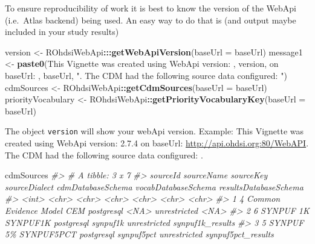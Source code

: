 \documentclass[
]{article}
\newenvironment{Shaded}{\begin{snugshade}}{\end{snugshade}}
\newcommand{\CommentTok}[1]{\textcolor[rgb]{0.56,0.35,0.01}{\textit{#1}}}
\newcommand{\DataTypeTok}[1]{\textcolor[rgb]{0.13,0.29,0.53}{#1}}
\newcommand{\KeywordTok}[1]{\textcolor[rgb]{0.13,0.29,0.53}{\textbf{#1}}}
\newcommand{\NormalTok}[1]{#1}
\newcommand{\OperatorTok}[1]{\textcolor[rgb]{0.81,0.36,0.00}{\textbf{#1}}}
\newcommand{\StringTok}[1]{\textcolor[rgb]{0.31,0.60,0.02}{#1}}
\begin{document}
To ensure reproducibility of work it is best to know the version of the
WebApi (i.e.~Atlas backend) being used. An easy way to do that is (and
output maybe included in your study results)

\begin{Shaded}
\begin{Highlighting}[]

\NormalTok{version <{-}}\StringTok{ }\NormalTok{ROhdsiWebApi}\OperatorTok{:::}\KeywordTok{getWebApiVersion}\NormalTok{(}\DataTypeTok{baseUrl =}\NormalTok{ baseUrl)}
\NormalTok{message1 <{-}}\StringTok{ }\KeywordTok{paste0}\NormalTok{(}\StringTok{\textquotesingle{}This Vignette was created using WebApi version: \textquotesingle{}}\NormalTok{, }
\NormalTok{                   version, }
                   \StringTok{\textquotesingle{} on baseUrl: \textquotesingle{}}\NormalTok{, }
\NormalTok{                   baseUrl, }
                   \StringTok{". The CDM had the following source data configured: "}\NormalTok{)}
\NormalTok{cdmSources <{-}}\StringTok{ }\NormalTok{ROhdsiWebApi}\OperatorTok{::}\KeywordTok{getCdmSources}\NormalTok{(}\DataTypeTok{baseUrl =}\NormalTok{ baseUrl)}
\NormalTok{priorityVocabulary <{-}}\StringTok{ }\NormalTok{ROhdsiWebApi}\OperatorTok{::}\KeywordTok{getPriorityVocabularyKey}\NormalTok{(}\DataTypeTok{baseUrl =}\NormalTok{ baseUrl)}
\end{Highlighting}
\end{Shaded}

The object \texttt{version} will show your webApi version. Example: This
Vignette was created using WebApi version: 2.7.4 on baseUrl:
\url{http://api.ohdsi.org:80/WebAPI}. The CDM had the following source
data configured: .

\begin{Shaded}
\begin{Highlighting}[]

\NormalTok{cdmSources}
\CommentTok{\#> \# A tibble: 3 x 7}
\CommentTok{\#>   sourceId sourceName            sourceKey  sourceDialect cdmDatabaseSchema vocabDatabaseSchema resultsDatabaseSchema}
\CommentTok{\#>      <int> <chr>                 <chr>      <chr>         <chr>             <chr>               <chr>                }
\CommentTok{\#> 1        4 Common Evidence Model CEM        postgresql    <NA>              unrestricted        <NA>                 }
\CommentTok{\#> 2        6 SYNPUF 1K             SYNPUF1K   postgresql    synpuf1k          unrestricted        synpuf1k\_results     }
\CommentTok{\#> 3        5 SYNPUF 5\%             SYNPUF5PCT postgresql    synpuf5pct        unrestricted        synpuf5pct\_results}
\end{Highlighting}
\end{Shaded}
\end{document}
